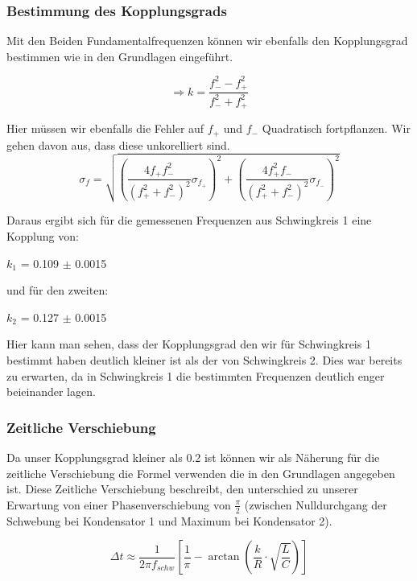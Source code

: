 \documentclass[twoside]{protokoll}
\begin{document}
\subsubsection{Bestimmung des Kopplungsgrads}

Mit den Beiden Fundamentalfrequenzen können wir ebenfalls den Kopplungsgrad bestimmen wie in den Grundlagen eingeführt.

\begin{equation}
    \Rightarrow k = \frac{f_-^2 - f_+^2}{f_-^2 + f_+^2}
\end{equation}

Hier müssen wir ebenfalls die Fehler auf $f_+$ und $f_-$ Quadratisch fortpflanzen. Wir gehen davon aus, dass diese unkorelliert sind.
\begin{equation}
\sigma_f =\sqrt{\left(\frac{4f_+f_-^2}{\left(f_+^2+f_-^2\right)^2}\sigma_{f_+}\right)^2 + \left(\frac{4f_+^2f_-}{\left(f_+^2+f_-^2\right)^2}\sigma_{f_-}\right)^2}
\end{equation}

Daraus ergibt sich für die gemessenen Frequenzen aus Schwingkreis 1 eine Kopplung von:
\begin{center}
$k_1$ = 0.109 $\pm$ 0.0015
\end{center}
und für den zweiten:
\begin{center}
$k_2$ = 0.127 $\pm$ 0.0015
\end{center}

Hier kann man sehen, dass der Kopplungsgrad den wir für Schwingkreis 1 bestimmt haben deutlich kleiner ist als der von Schwingkreis 2. 
Dies war bereits zu erwarten, da in Schwingkreis 1 die bestimmten Frequenzen deutlich enger beieinander lagen. 
\subsubsection{Zeitliche Verschiebung}

Da unser Kopplungsgrad kleiner als 0.2 ist können wir als Näherung für die zeitliche Verschiebung die Formel verwenden die in den Grundlagen angegeben ist. 
Diese Zeitliche Verschiebung beschreibt, den unterschied zu unserer Erwartung von einer Phasenverschiebung von $\frac{\pi}{2}$ (zwischen Nulldurchgang der Schwebung bei Kondensator 1 und Maximum bei Kondensator 2).
  
\begin{equation}
    \Delta t \approx \frac{1}{2 \pi f_{schw}} \left[ \frac{1}{\pi} - \arctan{\left( \frac{k}{R} \cdot \sqrt{\frac{L}{C}} \right)} \right]
\end{equation}
\end{document}
